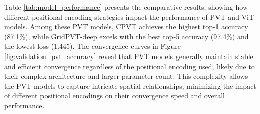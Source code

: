 \documentclass[letterpaper]{article} %
\begin{document}


Table \ref{tab:model_performance} presents the comparative results, showing how different positional encoding strategies impact the performance of PVT and ViT models. Among these PVT models, CPVT achieves the highest top-1 accuracy (87.1\%), while GridPVT-deep excels with the best top-5 accuracy (97.4\%) and the lowest loss (1.445). The convergence curves in Figure \ref{fig:validation_pvt_accuracy} reveal that PVT models generally maintain stable and efficient convergence regardless of the positional encoding used, likely due to their complex architecture and larger parameter count. This complexity allows the PVT models to capture intricate spatial relationships, minimizing the impact of different positional encodings on their convergence speed and overall performance. 
\end{document}
